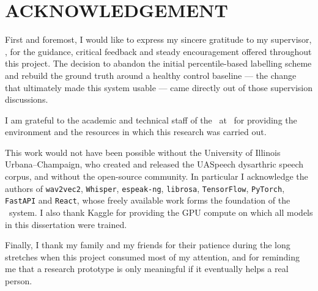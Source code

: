 \chapter*{ACKNOWLEDGEMENT}

First and foremost, I would like to express my sincere gratitude to my
supervisor, \supervisorName, for the guidance, critical feedback and steady
encouragement offered throughout this project. The decision to abandon the
initial percentile-based labelling scheme and rebuild the ground truth around a
healthy control baseline --- the change that ultimately made this system usable
--- came directly out of those supervision discussions.

I am grateful to the academic and technical staff of the \departmentName\ at
\universityName\ for providing the environment and the resources in which this
research was carried out.

This work would not have been possible without the University of Illinois
Urbana--Champaign, who created and released the UASpeech dysarthric speech
corpus, and without the open-source community. In particular I acknowledge the
authors of \texttt{wav2vec2}, \texttt{Whisper}, \texttt{espeak-ng},
\texttt{librosa}, \texttt{TensorFlow}, \texttt{PyTorch}, \texttt{FastAPI} and
\texttt{React}, whose freely available work forms the foundation of the
\systemName\ system. I also thank Kaggle for providing the GPU compute on which
all models in this dissertation were trained.

Finally, I thank my family and my friends for their patience during the long
stretches when this project consumed most of my attention, and for reminding me
that a research prototype is only meaningful if it eventually helps a real
person.

\vspace{1.5cm}
\noindent\authorName\\
\submissionMonthYear

\clearpage
